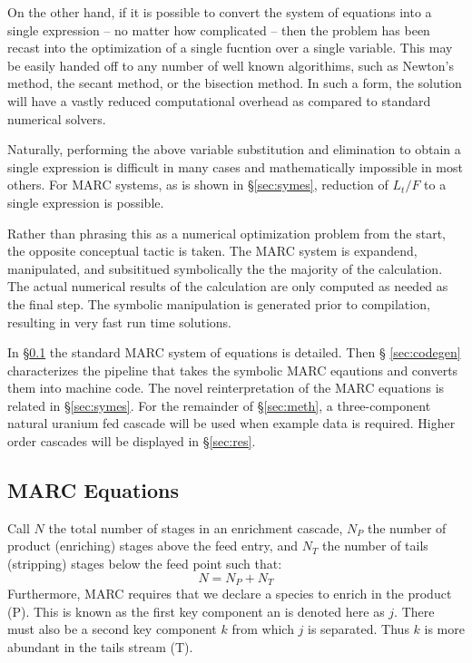 \documentclass[preprint,12pt]{elsarticle}
\begin{document}
On the other hand, if it is possible to convert the system of equations 
into a single expression -- no matter how complicated -- then the problem has been 
recast into the optimization of a single fucntion over a single variable.   This 
may be easily handed off to any number of well known algorithims, such as Newton's
method, the secant method, or the bisection method.  In such a form, the solution 
will have a vastly reduced computational overhead as compared to standard 
numerical solvers. 

Naturally, performing the above variable substitution and elimination to obtain a 
single expression is difficult in many cases and mathematically impossible in most 
others.  For MARC systems, as is shown in \S \ref{sec:symes}, reduction of $L_t/F$
to a single expression is possible.

Rather than phrasing this as a numerical optimization problem from the start, the 
opposite conceptual tactic is taken.  The MARC system is expandend, manipulated, 
and subsititued symbolically the the majority of the calculation.  The actual 
numerical results of the calculation are only computed as needed as the final step.
The symbolic manipulation is generated prior to compilation, resulting in 
very fast run time solutions.

In \S \ref{sec:marceq} the standard MARC system of equations is detailed. Then \S 
\ref{sec:codegen} characterizes the pipeline that takes the symbolic MARC eqautions 
and converts them into machine code.  The novel reinterpretation of the MARC equations
is related in \S \ref{sec:symes}.  For the remainder of \S \ref{sec:meth}, a
three-component natural uranium fed cascade will be used when example data is required.
Higher order cascades will be displayed in \S \ref{sec:res}.

\subsection{MARC Equations}
\label{sec:marceq}

Call $N$ the total number of stages in an enrichment cascade, $N_P$ the number of 
product (enriching) stages above the feed entry, and $N_T$ the number of tails
(stripping) stages below the feed point such that:
\begin{equation}
N = N_P + N_T
\end{equation}
Furthermore, MARC requires that we declare a species to enrich in the 
product (P).  This is known as the first key component an is denoted here as
$j$.  There must also be a second key component $k$ from which $j$ is 
separated. Thus $k$ is more abundant in the tails stream (T).
\end{document}
